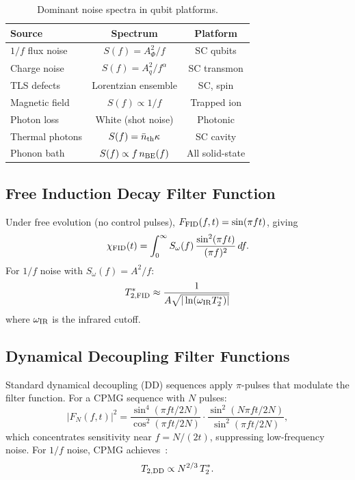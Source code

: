 \documentclass[aps,prd,twocolumn,superscriptaddress,nofootinbib]{revtex4-2}
\begin{document}
\begin{table}[h]
\caption{Dominant noise spectra in qubit platforms.}
\label{tab:noise}
\begin{ruledtabular}
\begin{tabular}{lcc}
\textbf{Source} & \textbf{Spectrum} & \textbf{Platform} \\
\hline
$1/f$ flux noise & $S(f) = A_\Phi^2/f$ & SC qubits \\
Charge noise & $S(f) = A_q^2/f^\alpha$ & SC transmon \\
TLS defects & Lorentzian ensemble & SC, spin \\
Magnetic field & $S(f) \propto 1/f$ & Trapped ion \\
Photon loss & White (shot noise) & Photonic \\
Thermal photons & $S(f) = \bar{n}_{\rm th}\kappa$ & SC cavity \\
Phonon bath & $S(f) \propto f\,n_{\rm BE}(f)$ & All solid-state \\
\end{tabular}
\end{ruledtabular}
\end{table}

\subsection{Free Induction Decay Filter Function}

Under free evolution (no control pulses), $F_{\rm FID}(f,t) = \sin(\pi ft)$,
giving
\begin{equation}
\chi_{\rm FID}(t) = \int_0^\infty S_\omega(f)\,
\frac{\sin^2(\pi ft)}{(\pi f)^2}\,df.
\end{equation}
For $1/f$ noise with $S_\omega(f) = A^2/f$:
\begin{equation}
T_{2,\rm FID}^{*} \approx \frac{1}{A\sqrt{|\ln(\omega_{\rm IR}T_2^*)|}}
\end{equation}
where $\omega_{\rm IR}$ is the infrared cutoff.

\subsection{Dynamical Decoupling Filter Functions}

Standard dynamical decoupling (DD) sequences apply $\pi$-pulses that
modulate the filter function. For a CPMG sequence with $N$ pulses:
\begin{equation}
|F_N(f,t)|^2 = \frac{\sin^4(\pi ft/2N)}{\cos^2(\pi ft/2N)}
\cdot\frac{\sin^2(N\pi ft/2N)}{\sin^2(\pi ft/2N)},
\end{equation}
which concentrates sensitivity near $f = N/(2t)$, suppressing low-frequency
noise. For $1/f$ noise, CPMG achieves~\cite{Bylander2011,Slichter2012}:
\begin{equation}
T_{2,\rm DD} \propto N^{2/3}\,T_{2}^*.
\end{equation}
\end{document}
